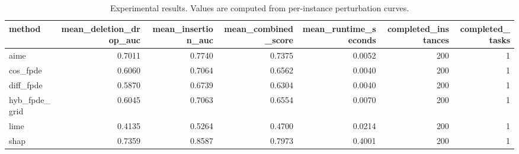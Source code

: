 \begin{table}[t]
\caption{Experimental results. Values are computed from per-instance perturbation curves.}
\label{tab:main_results_computed}
\centering
\begin{tabular}{lrrrrrr}
\toprule
method & mean\_deletion\_drop\_auc & mean\_insertion\_auc & mean\_combined\_score & mean\_runtime\_seconds & completed\_instances & completed\_tasks \\
\midrule
aime & 0.7011 & 0.7740 & 0.7375 & 0.0052 & 200 & 1 \\
cos\_fpde & 0.6060 & 0.7064 & 0.6562 & 0.0040 & 200 & 1 \\
diff\_fpde & 0.5870 & 0.6739 & 0.6304 & 0.0040 & 200 & 1 \\
hyb\_fpde\_grid & 0.6045 & 0.7063 & 0.6554 & 0.0070 & 200 & 1 \\
lime & 0.4135 & 0.5264 & 0.4700 & 0.0214 & 200 & 1 \\
shap & 0.7359 & 0.8587 & 0.7973 & 0.4001 & 200 & 1 \\
\bottomrule
\end{tabular}

\end{table}
